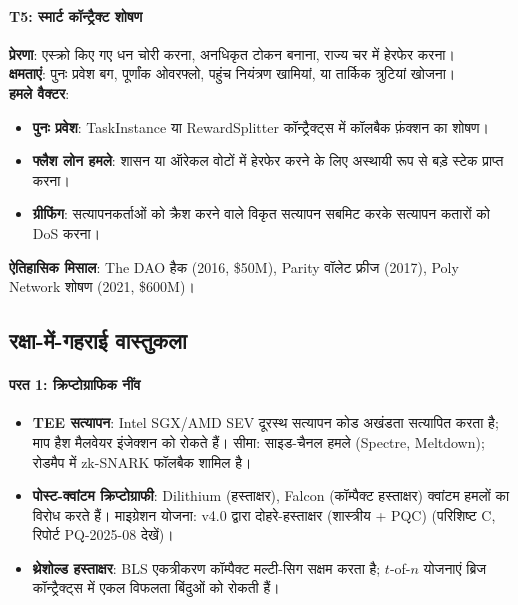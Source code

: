 \documentclass[11pt]{article}
\begin{document}
\begin{itemize}[noitemsep]
\begin{itemize}[noitemsep]
\begin{itemize}[noitemsep]
\begin{itemize}[noitemsep]
\paragraph{T5: स्मार्ट कॉन्ट्रैक्ट शोषण}
\textbf{प्रेरणा}: एस्क्रो किए गए धन चोरी करना, अनधिकृत टोकन बनाना, राज्य चर में हेरफेर करना।\\
\textbf{क्षमताएं}: पुनः प्रवेश बग, पूर्णांक ओवरफ्लो, पहुंच नियंत्रण खामियां, या तार्किक त्रुटियां खोजना।\\
\textbf{हमले वैक्टर}:
\begin{itemize}[noitemsep]
  \item \textbf{पुनः प्रवेश}: TaskInstance या RewardSplitter कॉन्ट्रैक्ट्स में कॉलबैक फ़ंक्शन का शोषण।
  \item \textbf{फ्लैश लोन हमले}: शासन या ऑरेकल वोटों में हेरफेर करने के लिए अस्थायी रूप से बड़े स्टेक प्राप्त करना।
  \item \textbf{ग्रीफिंग}: सत्यापनकर्ताओं को क्रैश करने वाले विकृत सत्यापन सबमिट करके सत्यापन कतारों को DoS करना।
\end{itemize}
\textbf{ऐतिहासिक मिसाल}: The DAO हैक (2016, \$50M), Parity वॉलेट फ्रीज (2017), Poly Network शोषण (2021, \$600M)।

\subsection{रक्षा-में-गहराई वास्तुकला}

\paragraph{परत 1: क्रिप्टोग्राफिक नींव}
\begin{itemize}[noitemsep]
  \item \textbf{TEE सत्यापन}: Intel SGX/AMD SEV दूरस्थ सत्यापन कोड अखंडता सत्यापित करता है; माप हैश मैलवेयर इंजेक्शन को रोकते हैं। सीमा: साइड-चैनल हमले (Spectre, Meltdown); रोडमैप में zk-SNARK फॉलबैक शामिल है।
  \item \textbf{पोस्ट-क्वांटम क्रिप्टोग्राफी}: Dilithium (हस्ताक्षर), Falcon (कॉम्पैक्ट हस्ताक्षर) क्वांटम हमलों का विरोध करते हैं। माइग्रेशन योजना: v4.0 द्वारा दोहरे-हस्ताक्षर (शास्त्रीय + PQC) (परिशिष्ट C, रिपोर्ट PQ-2025-08 देखें)।
  \item \textbf{थ्रेशोल्ड हस्ताक्षर}: BLS एकत्रीकरण कॉम्पैक्ट मल्टी-सिग सक्षम करता है; $t$-of-$n$ योजनाएं ब्रिज कॉन्ट्रैक्ट्स में एकल विफलता बिंदुओं को रोकती हैं।
\end{itemize}


\end{itemize}
\end{itemize}
\end{itemize}
\end{itemize}
\end{document}
